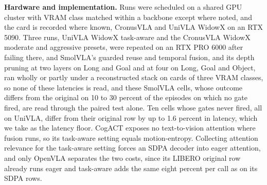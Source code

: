 \textbf{Hardware and implementation.} Runs were scheduled on a shared GPU
cluster with VRAM class matched within a backbone except where noted,
and the card is recorded where known, CronusVLA and UniVLA WidowX on an
RTX 5090. Three runs, UniVLA WidowX task-aware and the CronusVLA WidowX
moderate and aggressive presets, were repeated on an RTX PRO 6000 after
failing there, and SmolVLA's guarded reuse and temporal fusion, and its
depth pruning at two layers on Long and Goal and at four on Long, Goal
and Object, ran wholly or partly under a reconstructed stack on cards of
three VRAM classes, so none of these latencies is read, and these SmolVLA
cells, whose outcome differs from the original on 10 to 30 percent of the
episodes on which no gate fired, are read through the paired test alone.
Ten cells whose gates never fired, all on UniVLA, differ from their
original row by up to 1.6 percent in latency, which we take as the
latency floor.
CogACT exposes
no text-to-vision attention where fusion runs, so its task-aware setting
equals motion-entropy. Collecting attention relevance for the task-aware
setting forces an SDPA decoder into eager attention, and only OpenVLA
separates the two costs, since its LIBERO original row already runs eager
and task-aware adds the same eight percent per call as on its SDPA rows.

